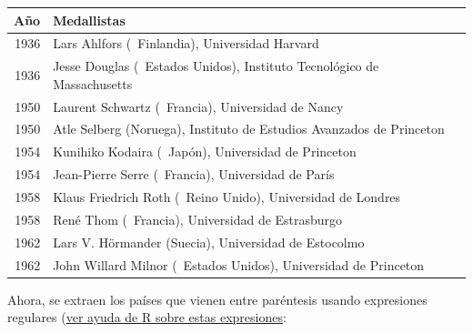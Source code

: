 \documentclass[]{article}
\newenvironment{Shaded}{\begin{snugshade}}{\end{snugshade}}
\newcommand{\KeywordTok}[1]{\textcolor[rgb]{0.13,0.29,0.53}{\textbf{#1}}}
\newcommand{\DecValTok}[1]{\textcolor[rgb]{0.00,0.00,0.81}{#1}}
\newcommand{\CharTok}[1]{\textcolor[rgb]{0.31,0.60,0.02}{#1}}
\newcommand{\StringTok}[1]{\textcolor[rgb]{0.31,0.60,0.02}{#1}}
\newcommand{\CommentTok}[1]{\textcolor[rgb]{0.56,0.35,0.01}{\textit{#1}}}
\newcommand{\OperatorTok}[1]{\textcolor[rgb]{0.81,0.36,0.00}{\textbf{#1}}}
\newcommand{\NormalTok}[1]{#1}
\begin{document}
\begin{tabular}{r|l}
\hline
Año & Medallistas\\
\hline
1936 & Lars Ahlfors ( Finlandia), Universidad Harvard\\
\hline
1936 & Jesse Douglas ( Estados Unidos), Instituto Tecnológico de Massachusetts\\
\hline
1950 & Laurent Schwartz ( Francia), Universidad de Nancy\\
\hline
1950 & Atle Selberg (Noruega), Instituto de Estudios Avanzados de Princeton\\
\hline
1954 & Kunihiko Kodaira ( Japón), Universidad de Princeton\\
\hline
1954 & Jean-Pierre Serre ( Francia), Universidad de París\\
\hline
1958 & Klaus Friedrich Roth ( Reino Unido), Universidad de Londres\\
\hline
1958 & René Thom ( Francia), Universidad de Estrasburgo\\
\hline
1962 & Lars V. Hörmander (Suecia), Universidad de Estocolmo\\
\hline
1962 & John Willard Milnor ( Estados Unidos), Universidad de Princeton\\
\hline
\end{tabular}

Ahora, se extraen los países que vienen entre paréntesis usando
expresiones regulares
(\href{https://stat.ethz.ch/R-manual/R-devel/library/base/html/regex.html\%20(ayuda\%20de\%20R)}{ver
ayuda de R sobre estas expresiones}:

\begin{Shaded}
\end{Shaded}
\end{document}
